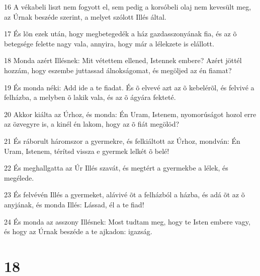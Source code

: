 \par 16 A vékabeli liszt nem fogyott el, sem pedig a korsóbeli olaj nem kevesült meg, az Úrnak beszéde szerint, a melyet szólott Illés által.
\par 17 És lõn ezek után, hogy megbetegedék a ház gazdasszonyának fia, és az õ betegsége felette nagy vala, annyira, hogy már a lélekzete is elállott.
\par 18 Monda azért Illésnek: Mit vétettem ellened, Istennek embere? Azért jöttél hozzám, hogy eszembe juttassad álnokságomat, és megöljed az én fiamat?
\par 19 És monda néki: Add ide a te fiadat. És õ elvevé azt az õ kebelérõl, és felvivé a felházba, a melyben õ lakik vala, és az õ ágyára fekteté.
\par 20 Akkor kiálta az Úrhoz, és monda: Én Uram, Istenem, nyomorúságot hozol erre az özvegyre is, a kinél én lakom, hogy az õ fiát megölöd?
\par 21 És ráborult háromszor a gyermekre, és felkiáltott az Úrhoz, mondván: Én Uram, Istenem, térítsd vissza e gyermek lelkét õ belé!
\par 22 És meghallgatta az Úr Illés szavát, és megtért a gyermekbe a lélek, és megélede.
\par 23 És felvévén Illés a gyermeket, alávivé õt a felházból a házba, és adá õt az õ anyjának, és monda Illés: Lássad, él a te fiad!
\par 24 És monda az asszony Illésnek: Most tudtam meg, hogy te Isten embere vagy, és hogy az Úrnak beszéde a te ajkadon: igazság.

\chapter{18}

